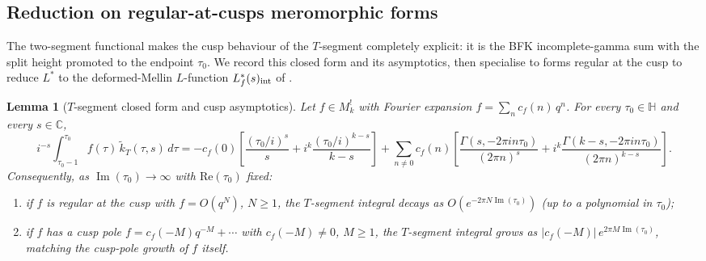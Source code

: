 \documentclass[11pt]{article}
\newtheorem{lemma}[theorem]{Lemma}
\numberwithin{equation}{section}  %
\newcommand{\HH}{\mathbb{H}}
\newcommand{\CC}{\mathbb{C}}
\DeclareMathOperator{\im}{Im}
\begin{document}
\subsection{Reduction on regular-at-cusps meromorphic forms}\label{subsec:reduction-to-int}

The two-segment functional makes the cusp behaviour of the $T$-segment
completely explicit: it is the BFK incomplete-gamma sum with the split
height promoted to the endpoint $\tau_0$.  We record this closed form
and its asymptotics, then specialise to forms regular at the cusp to
reduce $L^*$ to the deformed-Mellin $L$-function $L_f^*(s)_{\rm int}$
of \cite{1806}.

\begin{lemma}[$T$-segment closed form and cusp asymptotics]\label{lem:cusp-decay}
Let $f \in M^!_k$ with Fourier expansion $f = \sum_n c_f(n)\,q^n$.  For
every $\tau_0 \in \HH$ and every $s \in \CC$,
\begin{equation}\label{eq:T-segment-closed}
  i^{-s}\!\!\int_{\tau_0 - 1}^{\tau_0}\!\! f(\tau)\,\widetilde{k}_T(\tau, s)\,d\tau
  = -c_f(0)\!\left[\frac{(\tau_0/i)^s}{s} + i^k\frac{(\tau_0/i)^{k-s}}{k-s}\right]
  + \sum_{n \ne 0}\! c_f(n)\!\left[\frac{\Gamma(s, -2\pi i n\tau_0)}{(2\pi n)^s} + i^k\frac{\Gamma(k - s, -2\pi i n\tau_0)}{(2\pi n)^{k-s}}\right].
\end{equation}
Consequently, as $\im(\tau_0) \to \infty$ with $\mathrm{Re}(\tau_0)$
fixed:
\begin{enumerate}[label=(\alph*),leftmargin=2em]\itemsep0.1em
\item if $f$ is regular at the cusp with $f = O(q^N)$, $N \ge 1$, the
  $T$-segment integral decays as $O(e^{-2\pi N \im(\tau_0)})$ (up to a
  polynomial in $\tau_0$);
\item if $f$ has a cusp pole $f = c_f(-M)q^{-M} + \cdots$ with
  $c_f(-M) \ne 0$, $M \ge 1$, the $T$-segment integral grows as
  $|c_f(-M)|\,e^{2\pi M \im(\tau_0)}$, matching the cusp-pole growth of
  $f$ itself.
\end{enumerate}
\end{lemma}
\end{document}
